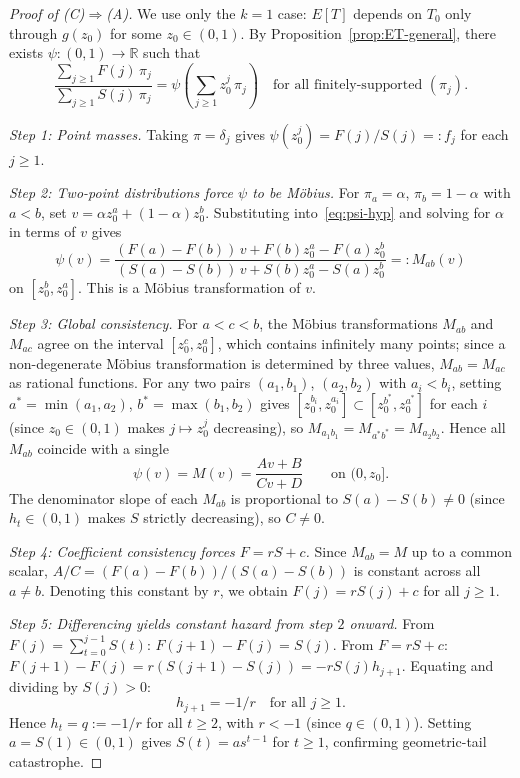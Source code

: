 \documentclass[11pt]{article}
\theoremstyle{plain}
\theoremstyle{definition}
\theoremstyle{remark}
\begin{document}
\begin{proof}[Proof of {\rm (C)$\Rightarrow$(A)}]
We use only the $k = 1$ case: $E[T]$ depends on $T_0$ only through $g(z_0)$ for some $z_0 \in (0,1)$.  By Proposition~\ref{prop:ET-general}, there exists $\psi: (0,1) \to \mathbb{R}$ such that
\begin{equation}\label{eq:psi-hyp}
  \frac{\sum_{j \geq 1} F(j)\,\pi_j}{\sum_{j \geq 1} S(j)\,\pi_j}
  = \psi\!\left(\sum_{j \geq 1} z_0^j\,\pi_j\right)
  \quad\text{for all finitely-supported } (\pi_j).
\end{equation}

\emph{Step 1: Point masses.}\;
Taking $\pi = \delta_j$ gives $\psi(z_0^j) = F(j)/S(j) =: f_j$ for each $j \geq 1$.

\emph{Step 2: Two-point distributions force $\psi$ to be M\"obius.}\;
For $\pi_a = \alpha$, $\pi_b = 1-\alpha$ with $a < b$, set $v = \alpha z_0^a + (1-\alpha)z_0^b$.  Substituting into~\eqref{eq:psi-hyp} and solving for $\alpha$ in terms of $v$ gives
\begin{equation}\label{eq:mobius-local}
  \psi(v) = \frac{(F(a)-F(b))\,v + F(b)z_0^a - F(a)z_0^b}{(S(a)-S(b))\,v + S(b)z_0^a - S(a)z_0^b}
  =: M_{ab}(v)
\end{equation}
on $[z_0^b, z_0^a]$.  This is a M\"obius transformation of $v$.

\emph{Step 3: Global consistency.}\;
For $a < c < b$, the M\"obius transformations $M_{ab}$ and $M_{ac}$ agree on the interval $[z_0^c, z_0^a]$, which contains infinitely many points; since a non-degenerate M\"obius transformation is determined by three values, $M_{ab} = M_{ac}$ as rational functions. For any two pairs $(a_1,b_1)$, $(a_2,b_2)$ with $a_i<b_i$, setting $a^*=\min(a_1,a_2)$, $b^*=\max(b_1,b_2)$ gives $[z_0^{b_i},z_0^{a_i}] \subset [z_0^{b^*},z_0^{a^*}]$ for each $i$ (since $z_0\in(0,1)$ makes $j\mapsto z_0^j$ decreasing), so $M_{a_1 b_1} = M_{a^*b^*} = M_{a_2 b_2}$.  Hence all $M_{ab}$ coincide with a single %
\begin{equation}\label{eq:global-mobius}
  \psi(v) = M(v) = \frac{Av + B}{Cv + D} \qquad \text{on } (0, z_0].
\end{equation}
The denominator slope of each $M_{ab}$ is proportional to $S(a) - S(b) \neq 0$ (since $h_t \in (0,1)$ makes $S$ strictly decreasing), so $C \neq 0$.

\emph{Step 4: Coefficient consistency forces $F = rS + c$.}\;
Since $M_{ab} = M$ up to a common scalar, $A/C = (F(a)-F(b))/(S(a)-S(b))$ is constant across all $a \neq b$.  Denoting this constant by $r$, we obtain $F(j) = rS(j) + c$ for all $j \geq 1$.

\emph{Step 5: Differencing yields constant hazard from step $2$ onward.}\;
From $F(j) = \sum_{t=0}^{j-1}S(t)$: $F(j+1) - F(j) = S(j)$.  From $F = rS + c$: $F(j+1) - F(j) = r(S(j+1) - S(j)) = -rS(j)h_{j+1}$.  Equating and dividing by $S(j) > 0$:
\[
  h_{j+1} = -1/r \quad\text{for all } j \geq 1.
\]
Hence $h_t = q := -1/r$ for all $t \geq 2$, with $r < -1$ (since $q \in (0,1)$).  Setting $a = S(1) \in (0,1)$ gives $S(t) = as^{t-1}$ for $t \geq 1$, confirming geometric-tail catastrophe.
\end{proof}
\end{document}
